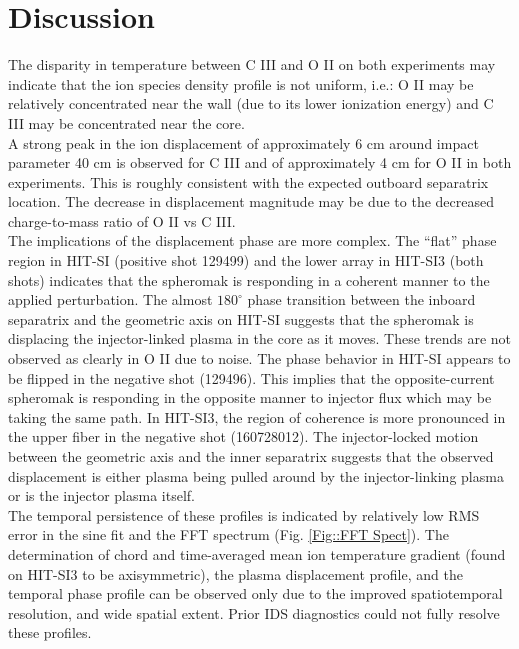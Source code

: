 	\section{Discussion}
	\hspace{4ex}The disparity in temperature between C III and O II on both experiments may indicate that the ion species density profile is not uniform, i.e.: O II may be relatively concentrated near the wall (due to its lower ionization energy) and C III may be concentrated near the core.  \\
	\hspace*{4ex}A strong peak in the ion displacement of approximately 6 cm around impact parameter 40 cm is observed for C III and of approximately 4 cm for O II in both experiments. This is roughly consistent with the expected outboard separatrix location\cite{hossack2015study}. The decrease in displacement magnitude may be due to the decreased charge-to-mass ratio of O II vs C III. \\
	\hspace*{4ex}The implications of the displacement phase are more complex. The ``flat'' phase region in HIT-SI (positive shot 129499) and the lower array in HIT-SI3 (both shots) indicates that the spheromak is responding in a coherent manner to the applied perturbation. The almost $180^\circ$ phase transition between the inboard separatrix and the geometric axis on HIT-SI suggests that the spheromak is displacing the injector-linked plasma in the core as it moves. These trends are not observed as clearly in O II due to noise. The phase behavior in HIT-SI appears to be flipped in the negative shot (129496). This implies that the opposite-current spheromak is responding in the opposite manner to injector flux which may be taking the same path. In HIT-SI3, the region of coherence is more pronounced in the upper fiber in the negative shot (160728012). The injector-locked motion between the geometric axis and the inner separatrix suggests that the observed displacement is either plasma being pulled around by the injector-linking plasma or is the injector plasma itself.\\
	\hspace*{4ex}The temporal persistence of these profiles is indicated by relatively low RMS error in the sine fit and the FFT spectrum (Fig. \ref{Fig::FFT Spect}). The determination of chord and time-averaged mean ion temperature gradient (found on HIT-SI3 to be axisymmetric), the plasma displacement profile, and the temporal phase profile can be observed only due to the improved spatiotemporal resolution, and wide spatial extent. Prior IDS diagnostics could not fully resolve these profiles.
	
